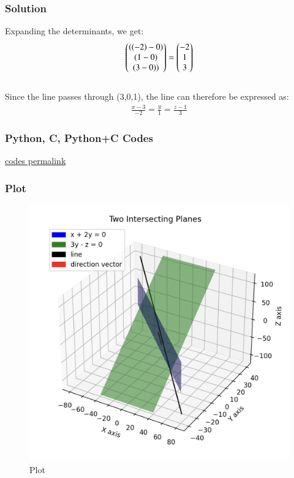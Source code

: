 \documentclass{beamer}
\begin{document}
\begin{frame}[fragile]
    \frametitle{Solution}
Expanding the determinants, we get: \begin{align}
\begin{pmatrix} ((-2) - 0) \\ (1-0)  \\ (3-0))\end{pmatrix} = \begin{pmatrix}-2\\1\\3\end{pmatrix} \end{align}\\ 

Since the line passes through (3,0,1), the line can therefore be expressed as: \\
\begin{align}
\frac{x-3}{-2} = \frac{y}{1} = \frac{z-1}{3}
\end{align} 
\end{frame}


\begin{frame}[fragile]
    \frametitle{Python, C, Python+C Codes}

\href{https://github.com/AdityaAppana/ee1030-2025/tree/8428703b12dd76c7f155f1738158e50a858c4817/ee25btech11004/matgeo/4.5.6/Codes}{codes permalink}

\end{frame}

\begin{frame}
\frametitle{Plot}
\begin{figure}[H]
    \centering
    \includegraphics[width=0.6\columnwidth]{Figs/Plot7.png}
    \caption{Plot}
    \label{fig:placeholder}
\end{figure}

\end{frame}
\end{document}

